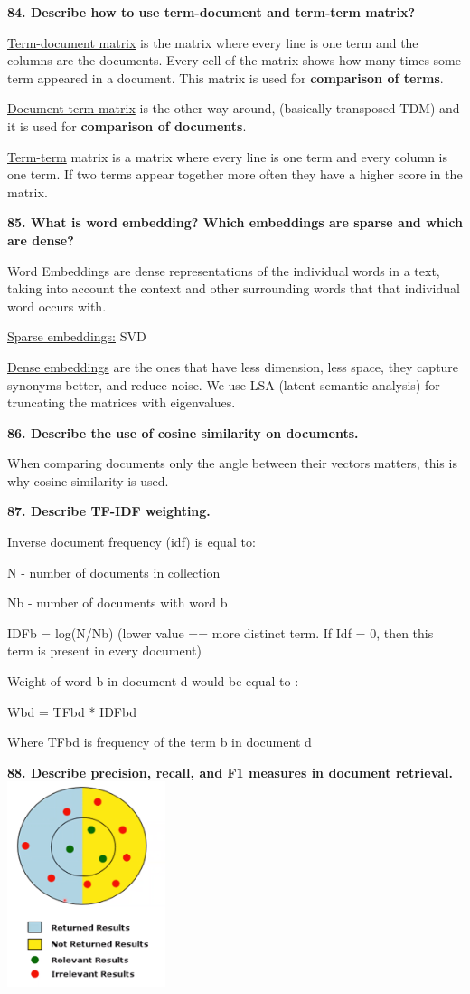 \textbf{84. Describe how to use term-document and term-term matrix?}

\underline{Term-document matrix} is the matrix where every line is one
term and the columns are the documents. Every cell of the matrix shows
how many times some term appeared in a document. This matrix is used for
\textbf{comparison of terms}.

\underline{Document-term matrix} is the other way around, (basically
transposed TDM) and it is used for \textbf{comparison of documents}.

\underline{Term-term} matrix is a matrix where every line is one term
and every column is one term. If two terms appear together more often
they have a higher score in the matrix.

\textbf{85. What is word embedding? Which embeddings are sparse and
which are dense?}

Word Embeddings are dense representations of the individual words in a
text, taking into account the context and other surrounding words that
that individual word occurs with.

\underline{Sparse embeddings:} SVD

\underline{Dense embeddings} are the ones that have less dimension, less
space, they capture synonyms better, and reduce noise. We use LSA
(latent semantic analysis) for truncating the matrices with eigenvalues.

\textbf{86. Describe the use of cosine similarity on documents.}

When comparing documents only the angle between their vectors matters,
this is why cosine similarity is used.

\textbf{87. Describe TF-IDF weighting.}

Inverse document frequency (idf) is equal to:

N - number of documents in collection

Nb - number of documents with word b

IDFb = log(N/Nb) (lower value == more distinct term. If Idf = 0, then
this term is present in every document)

Weight of word b in document d would be equal to :

Wbd = TFbd * IDFbd

Where TFbd is frequency of the term b in document d

\textbf{88. Describe precision, recall, and F1 measures in document
retrieval.}\includegraphics[width=1.81927in,height=2.35781in]{media/image23.png}

